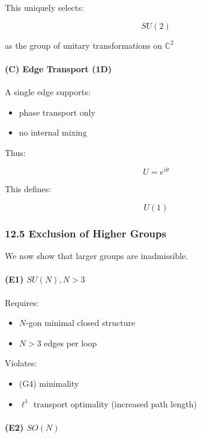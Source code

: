 \documentclass[
]{article}
\providecommand{\tightlist}{%
  \setlength{\itemsep}{0pt}\setlength{\parskip}{0pt}}
\begin{document}
This uniquely selects:

\[
SU(2)
\]

as the group of unitary transformations on \(\mathbb{C}^2\)

\paragraph{(C) Edge Transport (1D)}\label{c-edge-transport-1d}

A single edge supports:

\begin{itemize}
\tightlist
\item
  phase transport only
\item
  no internal mixing
\end{itemize}

Thus:

\[
U = e^{i\theta}
\]

This defines:

\[
U(1)
\]

\subsubsection{12.5 Exclusion of Higher
Groups}\label{exclusion-of-higher-groups}

We now show that larger groups are inadmissible.

\paragraph{\texorpdfstring{(E1)
\(SU(N), N > 3\)}{(E1) SU(N), N \textgreater{} 3}}\label{e1-sun-n-3}

Requires:

\begin{itemize}
\tightlist
\item
  \(N\)-gon minimal closed structure
\item
  \(N > 3\) edges per loop
\end{itemize}

Violates:

\begin{itemize}
\tightlist
\item
  (G4) minimality
\item
  \(\ell^1\) transport optimality (increased path length)
\end{itemize}

\paragraph{\texorpdfstring{(E2) \(SO(N)\)}{(E2) SO(N)}}\label{e2-son}
\end{document}
